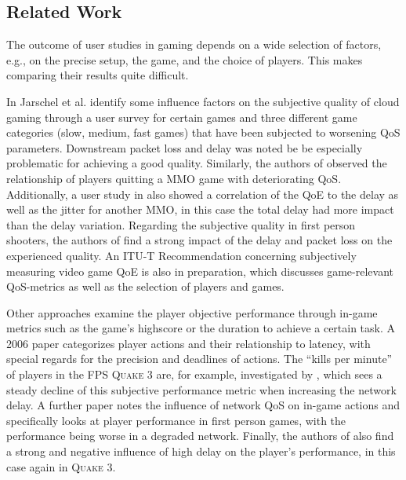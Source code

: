 


\subsection{Related Work}
\label{sec:relatedwork}

The outcome of user studies in gaming depends on a wide selection of factors, e.g., on the precise setup, the game, and the choice of players. This makes comparing their results quite difficult.

In \cite{5976180} Jarschel et al. identify some influence factors on the subjective quality of cloud gaming through a user survey for certain games and three different game categories (slow, medium, fast games) that have been subjected to worsening \gls{QoS} parameters. Downstream packet loss and delay was noted be be especially problematic for achieving a good quality. Similarly, the authors of \cite{4591393} observed the relationship of players quitting a \gls{MMO} game with deteriorating \gls{QoS}. Additionally, a user study in \cite{4604397} also showed a correlation of the \gls{QoE} to the delay as well as the jitter for another \gls{MMO}, in this case the total delay had more impact than the delay variation. Regarding the subjective quality in first person shooters, the authors of \cite{6614351} find a strong impact of the delay and packet loss on the experienced quality. An ITU-T Recommendation \cite{mollertowards} concerning subjectively measuring video game \gls{QoE} is also in preparation, which discusses game-relevant \gls{QoS}-metrics as well as the selection of players and games.

Other approaches examine the player objective performance through in-game metrics such as the game's highscore or the duration to achieve a certain task. A 2006 paper \cite{Claypool:2006:LPA:1167838.1167860} categorizes player actions and their relationship to latency, with special regards for the precision and deadlines of actions. The ``kills per minute'' of players in the \gls{FPS} \textsc{Quake 3} are, for example, investigated by \cite{1266180}, which sees a steady decline of this subjective performance metric when increasing the network delay. A further paper \cite{claypool2007} notes the influence of network \gls{QoS} on in-game actions and specifically looks at player performance in first person games, with the performance being worse in a degraded network. Finally, the authors of \cite{Bredel:2010:MSR:1944796.1944797} also find a strong and negative influence of high delay on the player's performance, in this case again in \textsc{Quake 3}. 

